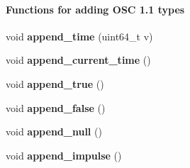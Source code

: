 \begin{Indent}\paragraph*{Functions for adding OSC 1.1 types}
\begin{DoxyCompactItemize}
\item 
\hypertarget{classtnyosc_1_1_message_ac9a236c7448f943336fdcd3d9ebc576a}{
void {\bfseries append\_\-time} (uint64\_\-t v)}
\label{classtnyosc_1_1_message_ac9a236c7448f943336fdcd3d9ebc576a}

\item 
\hypertarget{classtnyosc_1_1_message_a8695434364583e24ca146a57f061887f}{
void {\bfseries append\_\-current\_\-time} ()}
\label{classtnyosc_1_1_message_a8695434364583e24ca146a57f061887f}

\item 
\hypertarget{classtnyosc_1_1_message_a94b1ad3271cd739a46841842edbc01bf}{
void {\bfseries append\_\-true} ()}
\label{classtnyosc_1_1_message_a94b1ad3271cd739a46841842edbc01bf}

\item 
\hypertarget{classtnyosc_1_1_message_a931f270eda78ee387ce4113a278c332e}{
void {\bfseries append\_\-false} ()}
\label{classtnyosc_1_1_message_a931f270eda78ee387ce4113a278c332e}

\item 
\hypertarget{classtnyosc_1_1_message_a1f8fce2c36c6dfd71dbe1a4be98808f5}{
void {\bfseries append\_\-null} ()}
\label{classtnyosc_1_1_message_a1f8fce2c36c6dfd71dbe1a4be98808f5}

\item 
\hypertarget{classtnyosc_1_1_message_a537913b8fe3afdd10400d6f293b05ee3}{
void {\bfseries append\_\-impulse} ()}
\label{classtnyosc_1_1_message_a537913b8fe3afdd10400d6f293b05ee3}

\end{DoxyCompactItemize}
\end{Indent}
